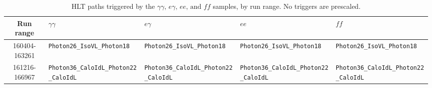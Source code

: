 \documentclass[dissertation.tex]{subfiles}
\begin{document}
\begin{table}[hcbp]
\caption{HLT paths triggered by the $\gamma\gamma\mbox{, }e\gamma\mbox{, }ee\mbox{, and }\mathit{ff}$ samples, by run range.  No triggers are prescaled.}
\centering
\begin{tabular}{|c|m{2.6cm}|m{2.6cm}|m{2.6cm}|m{2.6cm}|}
\hline
Run range & $\gamma\gamma$ & $e\gamma$ & $ee$ & $\mathit{ff}$ \\
\hline
\hline
160404-163261 & \texttt{Photon26\_}\newline \texttt{IsoVL\_}\newline \texttt{Photon18} & \texttt{Photon26\_}\newline \texttt{IsoVL\_}\newline \texttt{Photon18} & \texttt{Photon26\_}\newline \texttt{IsoVL\_}\newline \texttt{Photon18} & \texttt{Photon26\_}\newline \texttt{IsoVL\_}\newline \texttt{Photon18} \\
\hline
161216-166967 & \texttt{Photon36\_}\newline \texttt{CaloIdL\_}\newline \texttt{Photon22\_}\newline \texttt{CaloIdL} & \texttt{Photon36\_}\newline \texttt{CaloIdL\_}\newline \texttt{Photon22\_}\newline \texttt{CaloIdL} & \texttt{Photon36\_}\newline \texttt{CaloIdL\_}\newline \texttt{Photon22\_}\newline \texttt{CaloIdL} & \texttt{Photon36\_}\newline \texttt{CaloIdL\_}\newline \texttt{Photon22\_}\newline \texttt{CaloIdL} \\
\hline

\end{tabular}
\end{table}
\end{document}
